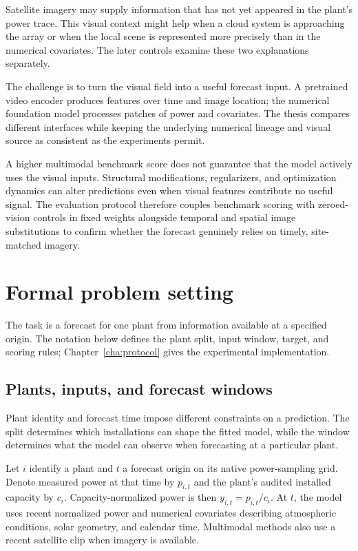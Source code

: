Satellite imagery may supply information that has not yet appeared in the plant's power trace. This visual context might help when a cloud system is approaching the array or when the local scene is represented more precisely than in the numerical covariates. The later controls examine these two explanations separately.

The challenge is to turn the visual field into a useful forecast input. A pretrained video encoder produces features over time and image location; the numerical foundation model processes patches of power and covariates. The thesis compares different interfaces while keeping the underlying numerical lineage and visual source as consistent as the experiments permit.

A higher multimodal benchmark score does not guarantee that the model actively uses the visual inputs. Structural modifications, regularizers, and optimization dynamics can alter predictions even when visual features contribute no useful signal. The evaluation protocol therefore couples benchmark scoring with zeroed-vision controls in fixed weights alongside temporal and spatial image substitutions to confirm whether the forecast genuinely relies on timely, site-matched imagery.

\section{Formal problem setting}

The task is a forecast for one plant from information available at a specified origin. The notation below defines the plant split, input window, target, and scoring rules; Chapter~\ref{cha:protocol} gives the experimental implementation.

\subsection{Plants, inputs, and forecast windows}

Plant identity and forecast time impose different constraints on a prediction. The split determines which installations can shape the fitted model, while the window determines what the model can observe when forecasting at a particular plant.

Let $i$ identify a plant and $t$ a forecast origin on its native power-sampling grid. Denote measured power at that time by $p_{i,t}$ and the plant's audited installed capacity by $c_i$. Capacity-normalized power is then $y_{i,t}=p_{i,t}/c_i$. At $t$, the model uses recent normalized power and numerical covariates describing atmospheric conditions, solar geometry, and calendar time. Multimodal methods also use a recent satellite clip when imagery is available.

